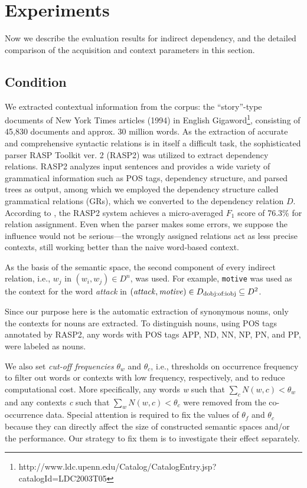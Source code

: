 \documentclass[english]{jnlp_1.4}
\begin{document}
\section{Experiments}

Now we describe the evaluation results for indirect dependency, and
the detailed comparison of the acquisition and context parameters in
this section.

\subsection{Condition}

We extracted contextual information from the corpus: the
``story''-type documents of New York Times articles (1994) in English
Gigaword\footnote{http://www.ldc.upenn.edu/Catalog/CatalogEntry.jsp?catalogId=LDC2003T05},
consisting of 45,830 documents and approx. 30 million words. As the
extraction of accurate and comprehensive syntactic relations is in
itself a difficult task, the sophisticated parser RASP Toolkit ver. 2
(RASP2) \cite{Briscoe:06} was utilized to extract dependency
relations. RASP2 analyzes input sentences and provides a wide variety of
grammatical information such as POS tags, dependency structure, and
parsed trees as output, among which we employed the dependency
structure called grammatical relations (GRs), which we converted to
the dependency relation $D$. According to \cite{Briscoe:06}, the RASP2
system achieves a micro-averaged $F_1$ score of 76.3\% for relation
assignment. Even when the parser makes some errors, we suppose the
influence would not be serious---the wrongly assigned relations act
as less precise contexts, still working better than the naive
word-based context.

As the basis of the semantic space, the second component of every
indirect relation, i.e., $w_j$ in $(w_i, w_j) \in D^n$, was used.  For
example, \verb|motive| was used as the context for the word {\it
  attack} in $({\it attack}, {\it motive}) \in D_{\rm dobj:of:iobj}
\subseteq D^2$.

Since our purpose here is the automatic extraction of synonymous
nouns, only the contexts for nouns are extracted. To distinguish
nouns, using POS tags annotated by RASP2, any words with POS tags APP,
ND, NN, NP, PN, and PP, were labeled as nouns.

We also set {\em cut-off frequencies} $\theta_w$ and $\theta_c$, i.e.,
thresholds on occurrence frequency to filter out words or contexts
with low frequency, respectively, and to reduce computational
cost. More specifically, any words {\it w} such that $\sum_c N(w, c) <
\theta_w$ and any contexts {\it c} such that $\sum_w N(w, c) <
\theta_c$ were removed from the co-occurrence data. Special attention
is required to fix the values of $\theta_f$ and $\theta_c$ because
they can directly affect the size of constructed semantic spaces
and/or the performance. Our strategy to fix them is to investigate
their effect separately.
\end{document}
